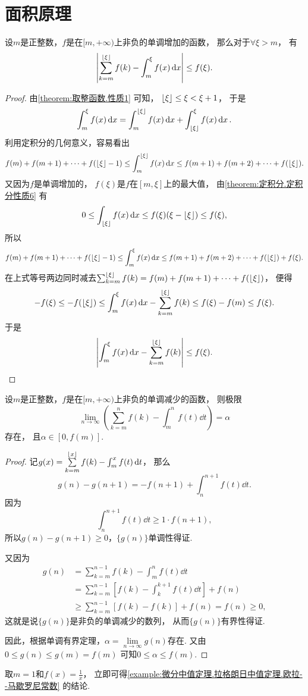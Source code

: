 \section{面积原理}
\begin{theorem}
设\(m\)是正整数，\(f\)是在\([m,+\infty)\)上非负的单调增加的函数，
那么对于\(\forall \xi>m\)，
有\[
	\abs{
		\sum_{k=m}^{\lfloor\xi\rfloor} f(k)
		- \int_m^\xi f(x) \dd{x}
	} \leq f(\xi).
\]
\begin{proof}
由\cref{theorem:取整函数.性质1} 可知，
\(\lfloor\xi\rfloor \leq \xi < \xi + 1\)，
于是\[
	\int_m^\xi f(x) \dd{x}
	= \int_m^{\lfloor\xi\rfloor} f(x) \dd{x}
	+ \int_{\lfloor\xi\rfloor}^\xi f(x) \dd{x}.
\]
利用定积分的几何意义，容易看出\[
	f(m) + f(m+1) + \dotsb + f(\lfloor\xi\rfloor-1)
	\leq \int_m^{\lfloor\xi\rfloor} f(x) \dd{x}
	\leq f(m+1) + f(m+2) + \dotsb + f(\lfloor\xi\rfloor).
\]
又因为\(f\)是单调增加的，
\(f(\xi)\)是\(f\)在\([m,\xi]\)上的最大值，
由\cref{theorem:定积分.定积分性质6} 有\[
	0 \leq \int_{\lfloor\xi\rfloor} f(x) \dd{x}
	\leq f(\xi) (\xi - \lfloor\xi\rfloor)
	\leq f(\xi),
\]
所以\[
	f(m) + f(m+1) + \dotsb + f(\lfloor\xi\rfloor-1)
	\leq \int_m^\xi f(x) \dd{x}
	\leq f(m+1) + f(m+2) + \dotsb + f(\lfloor\xi\rfloor) + f(\xi).
\]
在上式等号两边同时减去\(\sum_{k=m}^{\lfloor\xi\rfloor} f(k)
= f(m) + f(m+1) + \dotsb + f(\lfloor\xi\rfloor)\)，
便得\[
	-f(\xi)
	\leq -f(\lfloor\xi\rfloor)
	\leq \int_m^\xi f(x) \dd{x} - \sum_{k=m}^{\lfloor\xi\rfloor} f(k)
	\leq f(\xi) - f(m)
	\leq f(\xi).
\]
于是\[
	\abs{\int_m^\xi f(x) \dd{x} - \sum_{k=m}^{\lfloor\xi\rfloor} f(k)} \leq f(\xi).
	\qedhere
\]
\end{proof}
\end{theorem}

\begin{theorem}
设\(m\)是正整数，\(f\)是在\([m,+\infty)\)上非负的单调减少的函数，
则极限\[
	\lim\limits_{n\to\infty} \left(
	\sum\limits_{k=m}^n f(k)
	- \int_m^n f(t) \dd{t}
	\right)
	= \alpha
\]存在，
且\(\alpha\in[0,f(m)]\).
\begin{proof}
记\(g(x)
= \sum\limits_{k=m}^{\lfloor x\rfloor} f(k)
- \int_m^x f(t) \dd{t}\)，
那么\[
	g(n) - g(n+1)
	= -f(n+1)
	+ \int_n^{n+1} f(t) \dd{t}.
\]
因为\[
	\int_n^{n+1} f(t) \dd{t}
	\geq
	1 \cdot f(n+1),
\]
所以\(g(n) - g(n+1) \geq 0\)，\(\{g(n)\}\)单调性得证.

又因为\begin{align*}
	g(n)
	&= \sum\limits_{k=m}^{n-1} f(k) - \int_m^n f(t) \dd{t} \\
	&= \sum\limits_{k=m}^{n-1} \left[
			f(k) - \int_k^{k+1} f(t) \dd{t}
		\right] + f(n) \\
	&\geq \sum\limits_{k=m}^{n-1} [f(k) - f(k)] + f(n)
	= f(n) \geq 0,
\end{align*}
这就是说\(\{g(n)\}\)是非负的单调减少的数列，
从而\(\{g(n)\}\)有界性得证.

因此，根据单调有界定理，\(\alpha = \lim\limits_{n\to\infty} g(n)\)存在.
又由\(0 \leq g(n) \leq g(m) = f(m)\)
可知\(0 \leq \alpha \leq f(m)\).
\end{proof}
\end{theorem}
\begin{remark}
取\(m=1\)和\(f(x) = \frac1x\)，
立即可得\cref{example:微分中值定理.拉格朗日中值定理.欧拉--马歇罗尼常数} 的结论.
\end{remark}

